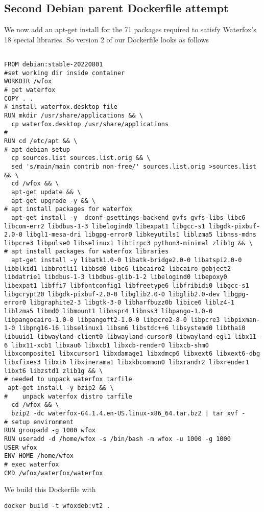 \documentclass{article}  %
\begin{document}
\subsection{Second Debian parent Dockerfile attempt}
We now add an apt-get install for the 71 packages required to satisfy Waterfox's 18 special libraries. So version 2 of our Dockerfile looks as follows
\begin{verbatim}

FROM debian:stable-20220801
#set working dir inside container
WORKDIR /wfox
# get waterfox
COPY . .
# install waterfox.desktop file
RUN mkdir /usr/share/applications && \
  cp waterfox.desktop /usr/share/applications
#
RUN cd /etc/apt && \
# apt debian setup
  cp sources.list sources.list.orig && \
  sed 's/main/main contrib non-free/' sources.list.orig >sources.list && \
  cd /wfox && \
  apt-get update && \
  apt-get upgrade -y && \
# apt install packages for waterfox
  apt-get install -y  dconf-gsettings-backend gvfs gvfs-libs libc6 libcom-err2 libdbus-1-3 libelogind0 libexpat1 libgcc-s1 libgdk-pixbuf-2.0-0 libgl1-mesa-dri libgpg-error0 libkeyutils1 liblzma5 libnss-mdns libpcre3 libpulse0 libselinux1 libtirpc3 python3-minimal zlib1g && \
# apt install packages for waterfox libraries
  apt-get install -y libatk1.0-0 libatk-bridge2.0-0 libatspi2.0-0 libblkid1 libbrotli1 libbsd0 libc6 libcairo2 libcairo-gobject2 libdatrie1 libdbus-1-3 libdbus-glib-1-2 libelogind0 libepoxy0 libexpat1 libffi7 libfontconfig1 libfreetype6 libfribidi0 libgcc-s1 libgcrypt20 libgdk-pixbuf-2.0-0 libglib2.0-0 libglib2.0-dev libgpg-error0 libgraphite2-3 libgtk-3-0 libharfbuzz0b libice6 liblz4-1 liblzma5 libmd0 libmount1 libnspr4 libnss3 libpango-1.0-0 libpangocairo-1.0-0 libpangoft2-1.0-0 libpcre2-8-0 libpcre3 libpixman-1-0 libpng16-16 libselinux1 libsm6 libstdc++6 libsystemd0 libthai0 libuuid1 libwayland-client0 libwayland-cursor0 libwayland-egl1 libx11-6 libx11-xcb1 libxau6 libxcb1 libxcb-render0 libxcb-shm0 libxcomposite1 libxcursor1 libxdamage1 libxdmcp6 libxext6 libxext6-dbg libxfixes3 libxi6 libxinerama1 libxkbcommon0 libxrandr2 libxrender1 libxt6 libzstd1 zlib1g && \
# needed to unpack waterfox tarfile
 apt-get install -y bzip2 && \
#    unpack waterfox distro tarfile
  cd /wfox && \
  bzip2 -dc waterfox-G4.1.4.en-US.linux-x86_64.tar.bz2 | tar xvf -
# setup environment
RUN groupadd -g 1000 wfox
RUN useradd -d /home/wfox -s /bin/bash -m wfox -u 1000 -g 1000
USER wfox
ENV HOME /home/wfox
# exec waterfox
CMD /wfox/waterfox/waterfox
\end{verbatim}
We build this Dockerfile with
\begin{verbatim}
docker build -t wfoxdeb:vt2 .
\end{verbatim}
\end{document}
